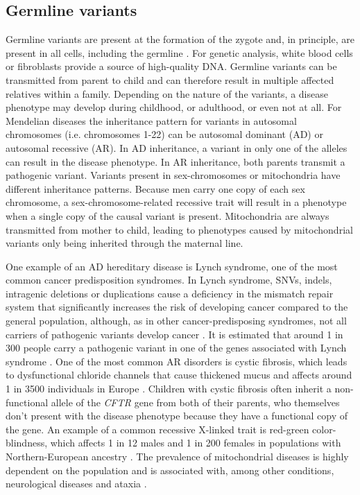 \subsection{Germline variants}
Germline variants are present at the formation of the zygote and, in principle, are present in all cells, including the germline \cite{Griffiths_2000}. 
For genetic analysis, white blood cells or fibroblasts provide a source of high-quality DNA. 
Germline variants can be transmitted from parent to child and can therefore result in multiple affected relatives within a family. 
Depending on the nature of the variants, a disease phenotype may develop during childhood, or adulthood, or even not at all. For Mendelian diseases the inheritance pattern for variants in autosomal chromosomes (i.e. chromosomes 1-22) can be autosomal dominant (AD) or autosomal recessive (AR). 
In AD inheritance, a variant in only one of the alleles can result in the disease phenotype. 
In AR inheritance, both parents transmit a pathogenic variant. 
Variants present in sex-chromosomes or mitochondria have different inheritance patterns. 
Because men carry one copy of each sex chromosome, a sex-chromosome-related recessive trait will result in a phenotype when a single copy of the causal variant is present. 
Mitochondria are always transmitted from mother to child, leading to phenotypes caused by mitochondrial variants only being inherited through the maternal line. 

One example of an AD hereditary disease is Lynch syndrome, one of the most common cancer predisposition syndromes. 
In Lynch syndrome, SNVs, indels, intragenic deletions or duplications cause a deficiency in the mismatch repair system that significantly increases the risk of developing cancer compared to the general population, although, as in other cancer-predisposing syndromes, not all carriers of pathogenic variants develop cancer \cite{Tutlewska_2013,Talseth_Palmer_2016}. 
It is estimated that around 1 in 300 people carry a pathogenic variant in one of the genes associated with Lynch syndrome \cite{Cancernet_2005}. 
One of the most common AR disorders is cystic fibrosis, which leads to dysfunctional chloride channels that cause thickened mucus and affects around 1 in 3500 individuals in Europe \cite{Yu_2018,Scotet_2012}. 
Children with cystic fibrosis often inherit a non-functional allele of the \textsl{CFTR} gene from both of their parents, who themselves don’t present with the disease phenotype because they have a functional copy of the gene. 
An example of a common recessive X-linked trait is red-green color-blindness, which affects 1 in 12 males and 1 in 200 females in populations with Northern-European ancestry \cite{Geneticshomereference_2019}. 
The prevalence of mitochondrial diseases is highly dependent on the population and is associated with, among other conditions, neurological diseases and ataxia \cite{Chinnery_2018}.

